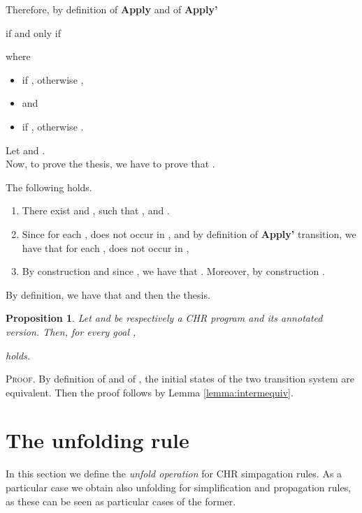 \documentclass[final]{acmtrans2e}
\newtheorem{proposition}[theorem]{Proposition}
\begin{document}
\begin{description}
Therefore, by definition of {\bf Apply} and of {\bf Apply'}

if and only if

where
\begin{itemize}
  \item  if ,
 otherwise ,
  \item  and
  \item  if ,
 otherwise .
\end{itemize}

Let  and
. \\

Now, to prove the thesis, we have to prove that
.

The following holds.

\begin{enumerate}
\item  There exist  and , such that ,
     and .
\item Since for each ,  does not occur in ,
  and by definition of \textbf{Apply'} transition, we have that for each ,  does not occur in ,
\item By construction and since , we have that .
Moreover, by construction  .
\end{enumerate}
By definition, we have that  and then the thesis.
\end{description}
\noindent{}


\begin{proposition}\label{lemma:nequality}
Let  and  be respectively a CHR program and its annotated version.
Then, for every goal ,

holds.
\end{proposition}
\textsc{Proof.} By definition of  and of ,
the initial states of the two transition system are equivalent. Then the proof follows by Lemma \ref{lemma:intermequiv}.

\section{The unfolding rule}\label{sec:unfolding}


In this section we define the \emph{unfold operation} for CHR
simpagation rules. As a particular case we obtain also
unfolding for  simplification and propagation rules, as these can
be seen as particular cases of the former.
\end{document}
